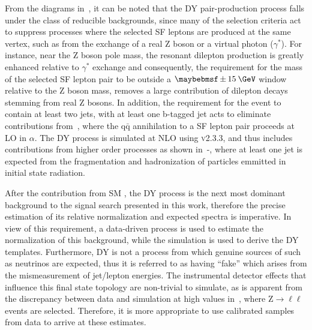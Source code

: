 From the diagrams in~, it can be noted that the DY pair-production process falls under the class of reducible backgrounds, since many of the selection criteria act to suppress processes where the selected SF leptons are produced at the same vertex, such as from the exchange of a real Z boson or a virtual photon ($\gamma^{*}$). For instance, near the Z boson pole mass, the resonant dilepton production is greatly enhanced relative to $\gamma^{*}$ exchange and consequently, the requirement for the mass of the selected SF lepton pair to be outside a $\pm15\:\GeV$ window relative to the Z boson mass, removes a large contribution of dilepton decays stemming from real Z bosons. In addition, the requirement for the event to contain at least two jets, with at least one b-tagged jet acts to eliminate contributions from~, where the q$\bar{\text{q}}$ annihilation to a SF lepton pair proceeds at LO in $\alpha$. The DY process is simulated at NLO using \AMCATNLO \textsc{v2.3.3}, and thus includes contributions from higher order processes as shown in~-, where at least one jet is expected from the fragmentation and hadronization of particles emmitted in initial state radiation.

After the contribution from SM \ttll, the DY process is the next most dominant background to the signal search presented in this work, therefore the precise estimation of its relative normalization and expected \MET spectra is imperative. In view of this requirement, a data-driven process is used to estimate the normalization of this background, while the simulation is used to derive the DY \MET templates. Furthermore, DY is not a process from which genuine sources of \MET such as neutrinos are expected, thus it is referred to as having ``fake'' \MET which arises from the mismeasurement of jet/lepton energies. The instrumental detector effects that influence this final state topology are non-trivial to simulate, as is apparent from the discrepancy between data and simulation at high \MET values in~, where $\text{Z}\rightarrow\ell\ell$ events are selected. Therefore, it is more appropriate to use calibrated samples from data to arrive at these estimates.  

